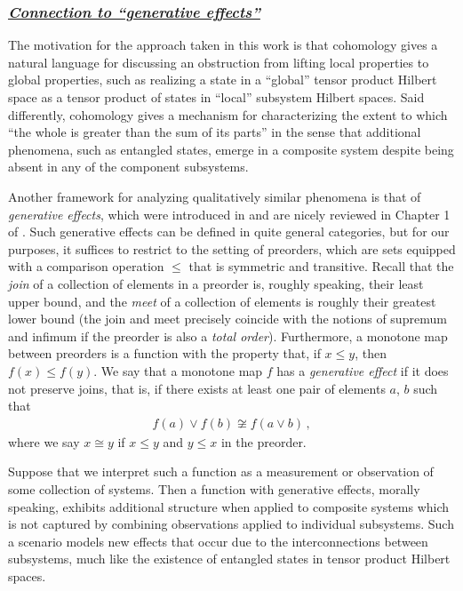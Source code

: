 \documentclass[12pt]{article}
\newcommand{\ul}[1]{{\underline{#1}}}
\numberwithin{equation}{section}
\begin{document}
\subsubsection*{\ul{\it Connection to ``generative effects''}}

The motivation for the approach taken in this work is that cohomology gives a natural language for discussing an obstruction from lifting local properties to global properties, such as realizing a state in a ``global'' tensor product Hilbert space as a tensor product of states in ``local'' subsystem Hilbert spaces. Said differently, cohomology gives a mechanism for characterizing the extent to which ``the whole is greater than the sum of its parts'' in the sense that additional phenomena, such as entangled states, emerge in a composite system despite being absent in any of the component subsystems.

Another framework for analyzing qualitatively similar phenomena is that of \emph{generative effects}, which were introduced in \cite{Adam2017SystemsGA} and are nicely reviewed in Chapter 1 of \cite{fong2018sevensketchescompositionalityinvitation}. Such generative effects can be defined in quite general categories, but for our purposes, it suffices to restrict to the setting of preorders, which are sets equipped with a comparison operation $\leq$ that is symmetric and transitive.  Recall that the \emph{join} of a collection of elements in a preorder is, roughly speaking, their least upper bound, and the \emph{meet} of a collection of elements is roughly their greatest lower bound (the join and meet precisely coincide with the notions of supremum and infimum if the preorder is also a \emph{total order}). Furthermore, a monotone map between preorders is a function with the property that, if $x \leq y$, then $f ( x ) \leq f ( y )$. We say that a monotone map $f$ has a \emph{generative effect} if it does not preserve joins, that is, if there exists at least one pair of elements $a$, $b$ such that
%
\begin{align}
    f ( a ) \vee f ( b ) \not\cong f ( a \vee b ) \, ,
\end{align}
%
where we say $x \cong y$ if $x \leq y$ and $y \leq x$ in the preorder.

Suppose that we interpret such a function as a measurement or observation of some collection of systems. Then a function with generative effects, morally speaking, exhibits additional structure when applied to composite systems which is not captured by combining observations applied to individual subsystems. Such a scenario models new effects that occur due to the interconnections between subsystems, much like the existence of entangled states in tensor product Hilbert spaces.
\end{document}
